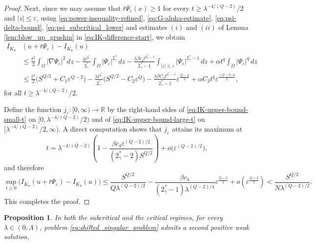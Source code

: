 \documentclass[11pt]{article}
\newtheorem{proposition}{Proposition}[section]
\begin{document}
\begin{proof}
Next, since we may assume that $t\Psi_\varepsilon(x) \ge 1$ for every $t \ge \lambda^{-4/(Q-2)}/2$ and $|z| \le \varepsilon$, using \eqref{eq:power-inequality-refined}, \eqref{eq:G-alpha-estimate}, \eqref{eq:psi-delta-bound}, \eqref{eq:psi_subcritical_lower} and estimates $(i)$ and $(ii)$ of Lemma \ref{lem:blow_up_grushin} in \eqref{eq:IK-difference-start}, we obtain
\begin{equation}\label{eq:IK-upper-bound-large-t}
\begin{aligned}
I_{K_u}&(u + t\Psi_\varepsilon) - I_{K_u}(u)\\
&\le \frac{t^2}{2} \int_{\Omega} |\nabla \Psi_\varepsilon|^2 \, dz
- \frac{\lambda t^{2_{\gamma}^*}}{2_{\gamma}^*} \int_{\Omega} |\Psi_\varepsilon|^{2_{\gamma}^*} \, dz
- \frac{\lambda \beta c_4 t^{2_{\gamma}^*-1}}{2_{\gamma}^* - 1} \int_{|z| \le \varepsilon} |\Psi_\varepsilon|^{2_{\gamma}^*-1} \, dz
+ \alpha t^q \int_{\Omega} |\Psi_\varepsilon|^q \, dz \\
&\le \frac{t^2}{2} \big( S^{Q/2} + C_1 \varepsilon^{Q-2} \big)
- \frac{\lambda t^{2_{\gamma}^*}}{2_{\gamma}^*} \big( S^{Q/2} - C_2 \varepsilon^{Q} \big)
- \frac{\lambda \beta C_4 t^{2_{\gamma}^*-1}}{2_{\gamma}^* - 1} \varepsilon^{\frac{Q-2}{2}}
+ \alpha C_3 t^q \varepsilon^{\frac{(Q-2)q}{2}},
\end{aligned}
\end{equation}
for all $t \ge \lambda^{-4/(Q-2)}/2$.

Define the function $j_\varepsilon : [0, \infty) \to \mathbb{R}$ by the right-hand sides of
\eqref{eq:IK-upper-bound-small-t} on $[0, \lambda^{-4/(Q-2)}/2)$ and of \eqref{eq:IK-upper-bound-large-t} on
$[\lambda^{-4/(Q-2)}/2, \infty)$. A direct computation shows that $j_\varepsilon$ attains its maximum at
\[
t = \lambda^{-4/(Q-2)} \left( 1 - \frac{\beta c_4 \varepsilon^{(Q-2)/2}}{(2_{\gamma}^* - 2) S^{Q/2}} \right)
+ o\big( \varepsilon^{(Q-2)/2} \big),
\]
and therefore
\begin{equation*}
\sup_{t \ge 0} \big( I_{K_u}(u + t\Psi_\varepsilon) - I_{K_u}(u) \big)
\le
\frac{S^{Q/2}}{Q \lambda^{(Q-2)/2}}
- \frac{\beta c_4}{(2_{\gamma}^* - 1)\lambda^{(Q-2)/4}} \varepsilon^{\frac{Q-2}{2}}
+ o\!\left( \varepsilon^{\frac{Q-2}{2}} \right)
<
\frac{S^{Q/2}}{N \lambda^{(Q-2)/2}} .
\end{equation*}
This completes the proof.
\end{proof}

\begin{proposition}
In both the subcritical and the critical regimes, for every $\lambda \in (0,\Lambda)$, problem \eqref{eq:shifted_singular_problem} admits a second positive weak solution.
\end{proposition}
\end{document}
